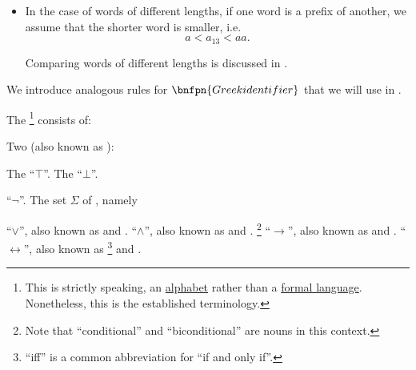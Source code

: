 \begin{remark}
\begin{itemize}
    \item In the case of words of different lengths, if one word is a prefix of another, we assume that the shorter word is smaller, i.e.
    \begin{equation*}
      a < a_{13} < aa.
    \end{equation*}

    Comparing words of different lengths is discussed in .
  \end{itemize}

  We introduce analogous rules for \( \bnfpn{Greek identifier} \) that we will use in .
\end{remark}

\begin{definition}\label{def:propositional_language}
  The \footnote{This is strictly speaking, an \hyperref[def:formal_language]{alphabet} rather than a \hyperref[def:formal_language/language]{formal language}. Nonetheless, this is the established terminology.} consists of:

  \begin{thmenum}
     Two  (also known as ):
    \begin{thmenum}
       The  \enquote{\( \top \)}.
       The  \enquote{\( \bot \)}.
    \end{thmenum}

      \enquote{\( \neg \)}.
     The set \( \Sigma \) of , namely
    \begin{thmenum}
        \enquote{\( \vee \)}, also known as \hyperref[def:standard_boolean_operators]{} and \hyperref[def:lattice/join]{}.
        \enquote{\( \wedge \)}, also known as \hyperref[def:standard_boolean_operators]{} and \hyperref[def:lattice/meet]{}.
       \footnote{Note that \enquote{conditional} and \enquote{biconditional} are nouns in this context.} \enquote{\( \rightarrow \)}, also known as  and \hyperref[def:material_implication]{}.
        \enquote{\( \leftrightarrow \)}, also known as \footnote{\enquote{iff} is a common abbreviation for \enquote{if and only if}.} and .
    \end{thmenum}


\end{thmenum}
\end{definition}

